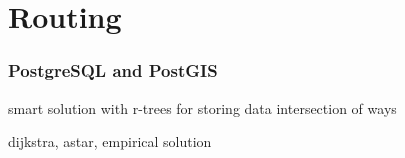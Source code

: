 \documentclass[14pt]{beamer}
\begin{document}
\section{Routing}

\begin{frame}
  \frametitle{PostgreSQL and PostGIS}

\end{frame}

\begin{frame}
  smart solution with r-trees for storing data
  intersection of ways
\end{frame}

\begin{frame}
  dijkstra, astar, empirical solution
\end{frame}










\end{document}
